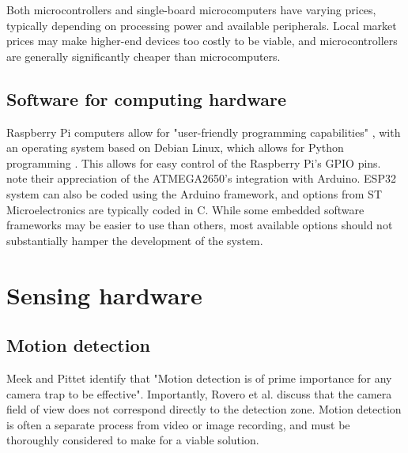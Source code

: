 \documentclass[class=report,11pt,crop=false]{standalone}
\begin{document}
Both microcontrollers and single-board microcomputers have varying prices, typically depending on processing power and available peripherals. Local market prices may make higher-end devices too costly to be viable, and microcontrollers are generally significantly cheaper than microcomputers.

\subsection{Software for computing hardware}

Raspberry Pi computers allow for "user-friendly programming capabilities" \cite{jolles2021broad-scale}, with an operating system based on Debian Linux, which allows for Python programming \cite{prinz2016a}. This allows for easy control of the Raspberry Pi's GPIO pins. \cite{camacho2017deployment} note their appreciation of the ATMEGA2650's integration with Arduino. ESP32 system can also be coded using the Arduino framework, and options from ST Microelectronics are typically coded in C. While some embedded software frameworks may be easier to use than others, most available options should not substantially hamper the development of the system.

\section{Sensing hardware}

\subsection{Motion detection}

Meek and Pittet \cite{meek2012user} identify that "Motion detection is of prime importance for any camera trap to be effective". Importantly, Rovero et al. \cite{rovero2013which} discuss that the camera field of view does not correspond directly to the detection zone. Motion detection is often a separate process from video or image recording, and must be thoroughly considered to make for a viable solution.
\end{document}
